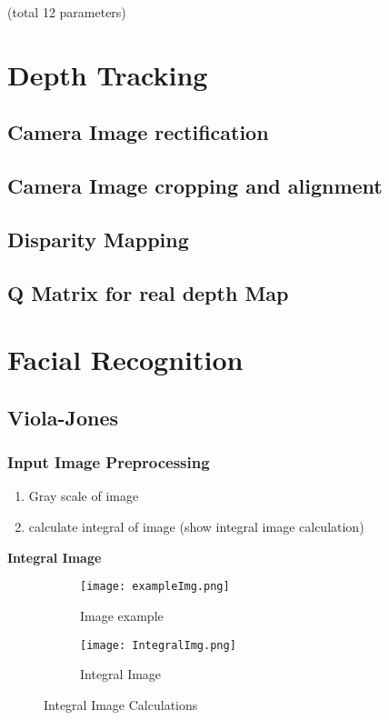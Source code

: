 \documentclass{article}
\newcommand{\imgsubsec}[2]{
    \graphicspath{ {./Images/#1/#2/} }
}
\begin{document}
(total 12 parameters)

\section{Depth Tracking}

\subsection{Camera Image rectification}
\subsection{Camera Image cropping and alignment}
\subsection{Disparity Mapping}
\subsection{Q Matrix for real depth Map}



\section{Facial Recognition}

\subsection{Viola-Jones}
\imgsubsec{FacialRecognition}{ViolaJones}

\subsubsection{Input Image Preprocessing}

\begin{enumerate}
    \item Gray scale of image
    \item calculate integral of image (show integral image calculation)
\end{enumerate}

\textbf{Integral Image}

\begin{figure}[h]
    \begin{subfigure}{0.5\textwidth}
        \texttt{[image: exampleImg.png]} 
        \caption{Image example}
        \label{fig:vj:exm}
    \end{subfigure}
    \begin{subfigure}{0.5\textwidth}
        \texttt{[image: IntegralImg.png]}
        \caption{Integral Image}
        \label{fig:vj:int}
    \end{subfigure}
    \caption{Integral Image Calculations}
    \label{fig:vj:main}
\end{figure}
\end{document}
